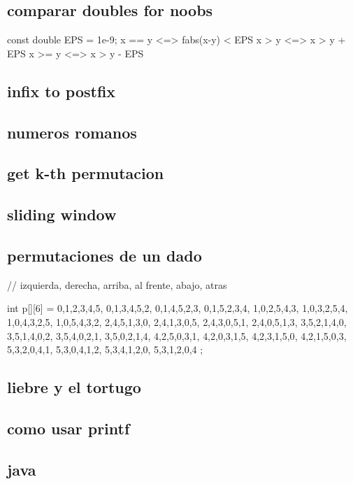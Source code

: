 \subsection{comparar doubles for noobs}
\begin{code}
const double EPS = 1e-9;
x == y	<=> fabs(x-y) < EPS
x >  y	<=> x > y + EPS
x >= y	<=> x > y - EPS
\end{code}
\subsection{infix to postfix}
\subsection{numeros romanos}
\subsection{get k-th permutacion}
\subsection{sliding window}
\subsection{permutaciones de un dado}
\begin{code}
// izquierda, derecha, arriba, al frente, abajo, atras

int p[][6] = {
    {0,1,2,3,4,5},
    {0,1,3,4,5,2},
    {0,1,4,5,2,3},
    {0,1,5,2,3,4},
    {1,0,2,5,4,3},
    {1,0,3,2,5,4},
    {1,0,4,3,2,5},
    {1,0,5,4,3,2},
    {2,4,5,1,3,0},
    {2,4,1,3,0,5},
    {2,4,3,0,5,1},
    {2,4,0,5,1,3},
    {3,5,2,1,4,0},
    {3,5,1,4,0,2},
    {3,5,4,0,2,1},
    {3,5,0,2,1,4},
    {4,2,5,0,3,1},
    {4,2,0,3,1,5},
    {4,2,3,1,5,0},
    {4,2,1,5,0,3},
    {5,3,2,0,4,1},
    {5,3,0,4,1,2},
    {5,3,4,1,2,0},
    {5,3,1,2,0,4}
};
\end{code}
\subsection{liebre y el tortugo}
\subsection{como usar printf}
\subsection{java}
